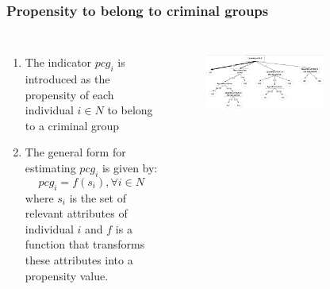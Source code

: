 \documentclass[aspectratio=169]{beamer}
\begin{document}
\begin{frame}
\frametitle{Propensity to belong to criminal groups}
  \begin{columns}
    \begin{enumerate}
      \item The indicator $pcg_i$ is introduced as the propensity of each individual $i \in N$ to belong to a criminal group
      \item The general form for estimating $pcg_i$ is given by:     
      \begin{equation*}
        pcg_i = f(s_i), \forall i \in N
      \end{equation*}
      where $s_i$ is the set of relevant attributes of individual $i$ and $f$ is a function that transforms these attributes into a propensity value.
    \end{enumerate}
    \begin{figure}[ht]
      \centering
       {\includegraphics[width=0.7\textwidth]{images/decision-tree.png}}
    \end{figure}
  \end{columns}
\end{frame}
\end{document}
